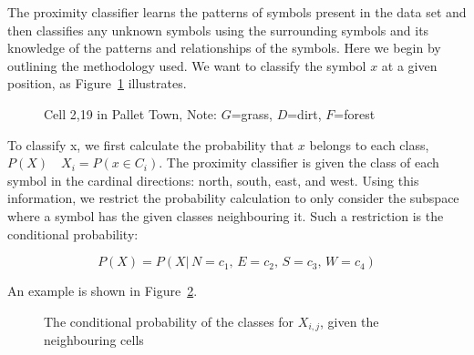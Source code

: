 The proximity classifier learns the patterns of symbols present in the data set and then
classifies any unknown symbols using the surrounding symbols and its knowledge of the
patterns and relationships of the symbols. Here we begin by outlining the methodology used.
We want to classify the symbol $x$ at a given position, as Figure~\ref{fig:neighbours} illustrates.

\begin{figure}[h]
\begin{center}
\end{center}
\caption{Cell 2,19 in Pallet Town, Note: $G$=grass, $D$=dirt, $F$=forest}
\label{fig:neighbours}
\end{figure}

To classify x, we first calculate the
probability that $x$ belongs to each class, $P(X)\quad X_i = P(x\!\in\! C_i)$.
The proximity classifier is given the class of each symbol in the
cardinal directions: north, south, east, and west. Using this information,
we restrict the probability calculation to only consider the subspace
where a symbol has the given classes neighbouring it. Such a restriction is
the conditional probability:

\[
P(X) = P(X|\,N\!=\!c_1,\,E\!=\!c_2,\,S\!=\!c_3,\,W\!=\!c_4)
\]

An example is shown in Figure~\ref{fig:conditionalprob}.

\begin{figure}[h]
\begin{center}
\end{center}
\caption{The conditional probability of the classes for $X_{i,j}$, given the neighbouring cells}
\label{fig:conditionalprob}
\end{figure}



